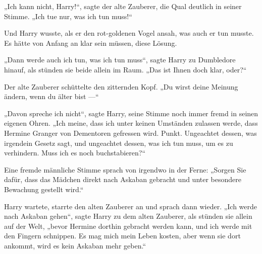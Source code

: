 „Ich kann nicht, Harry!“, sagte der alte Zauberer, die Qual deutlich in seiner Stimme.
„Ich tue nur, was ich tun muss!“

Und Harry wusste, als er den rot-goldenen Vogel ansah, was auch er tun musste. Es hätte von Anfang an klar sein müssen, diese Lösung.

„Dann werde auch ich tun, was ich tun muss“, sagte Harry zu Dumbledore hinauf, als stünden sie beide allein im Raum.
„Das ist Ihnen doch klar, oder?“

Der alte Zauberer schüttelte den zitternden Kopf.
„Du wirst deine Meinung ändern, wenn du älter bist —“

„Davon spreche ich nicht“, sagte Harry, seine Stimme noch immer fremd in seinen eigenen Ohren.
„Ich meine, dass ich unter keinen Umständen zulassen werde, dass Hermine Granger von Dementoren gefressen wird. Punkt. Ungeachtet dessen, was irgendein Gesetz sagt, und ungeachtet dessen, was ich tun muss, um es zu verhindern. Muss ich es noch buchstabieren?“

Eine fremde männliche Stimme sprach von irgendwo in der Ferne:
„Sorgen Sie dafür, dass das Mädchen direkt nach Askaban gebracht und unter besondere Bewachung gestellt wird.“

Harry wartete, starrte den alten Zauberer an und sprach dann wieder.
„Ich werde nach Askaban gehen“, sagte Harry zu dem alten Zauberer, als stünden sie allein auf der Welt, „bevor Hermine dorthin gebracht werden kann, und ich werde mit den Fingern schnippen. Es mag mich mein Leben kosten, aber wenn sie dort ankommt, wird es kein Askaban mehr geben.“

